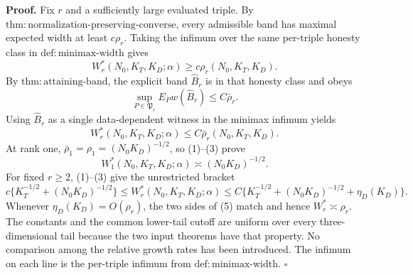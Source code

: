 \textbf{Proof.}
Fix \(r\) and a sufficiently large evaluated triple.  By
\(\mathrm{thm:normalization\mbox{-}preserving\mbox{-}converse}\), every
admissible band has maximal expected width at least \(c\rho_r\).  Taking
the infimum over the same per-triple honesty class in
\(\mathrm{def:minimax\mbox{-}width}\) gives
\[
 W_r^*(N_0,K_T,K_D;\alpha)\ge c\rho_r(N_0,K_T,K_D).         \tag{1}
\]
By \(\mathrm{thm:attaining\mbox{-}band}\), the explicit band
\(\widehat B_r\) is in that honesty class and obeys
\[
 \sup_{P\in\mathfrak P_r}E_Pw(\widehat B_r)
 \le C\bar\rho_r.                                           \tag{2}
\]
Using \(\widehat B_r\) as a single data-dependent witness in the minimax
infimum yields
\[
 W_r^*(N_0,K_T,K_D;\alpha)\le C\bar\rho_r(N_0,K_T,K_D).     \tag{3}
\]
At rank one,
\(\bar\rho_1=\rho_1=(N_0K_D)^{-1/2}\), so (1)--(3) prove
\[
 W_1^*(N_0,K_T,K_D;\alpha)\asymp(N_0K_D)^{-1/2}.            \tag{4}
\]
For fixed \(r\ge2\), (1)--(3) give the unrestricted bracket
\[
 c\{K_T^{-1/2}+(N_0K_D)^{-1/2}\}
 \le W_r^*(N_0,K_T,K_D;\alpha)
 \le C\{K_T^{-1/2}+(N_0K_D)^{-1/2}+\eta_D(K_D)\}.           \tag{5}
\]
Whenever \(\eta_D(K_D)=O(\rho_r)\), the two sides of (5) match and hence
\(W_r^*\asymp\rho_r\).  The constants and the common lower-tail cutoff are
uniform over every three-dimensional tail because the two input theorems
have that property.  No comparison among the relative growth rates has
been introduced.  The infimum on each line is the per-triple infimum from
\(\mathrm{def:minimax\mbox{-}width}\). \(\square\)